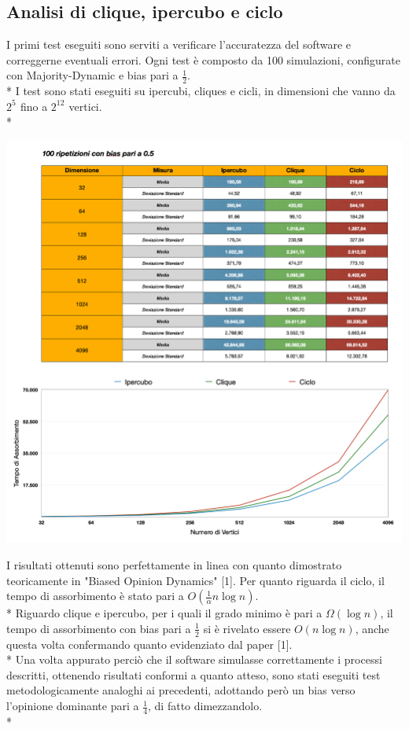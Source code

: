 \documentclass{article}
\begin{document}
\subsection{Analisi di clique, ipercubo e ciclo}
I primi test eseguiti sono serviti a verificare l'accuratezza del software e correggerne eventuali errori. Ogni test è composto da 100 simulazioni, configurate con Majority-Dynamic e bias pari a $\frac{1}{2}$.\\*
I test sono stati eseguiti su ipercubi, cliques e cicli, in dimensioni che vanno da $2^{5^{\mathrm{}}}$ fino a $2^{12^{\mathrm{}}}$ vertici.\\*
\begin{center}
\includegraphics[width=1\textwidth]{Test/test_bias05.png}
\end{center}
I risultati ottenuti sono perfettamente in linea con quanto dimostrato teoricamente in  "Biased Opinion Dynamics" [1]. Per quanto riguarda il ciclo, il tempo di assorbimento è stato pari a $O(\frac{1}{\alpha}n\log{}n)$. \\*
Riguardo clique e ipercubo, per i quali il grado minimo è pari a $\Omega(\log{}n)$, il tempo di assorbimento con bias pari a $\frac{1}{2}$ si è rivelato essere $O(n\log{}n)$, anche questa volta confermando quanto evidenziato dal paper [1].\\*
Una volta appurato perciò che il software simulasse correttamente i processi descritti, ottenendo risultati conformi a quanto atteso, sono stati eseguiti test metodologicamente analoghi ai precedenti, adottando però un bias verso l'opinione dominante pari a $\frac{1}{4}$, di fatto dimezzandolo.\\*
\end{document}
